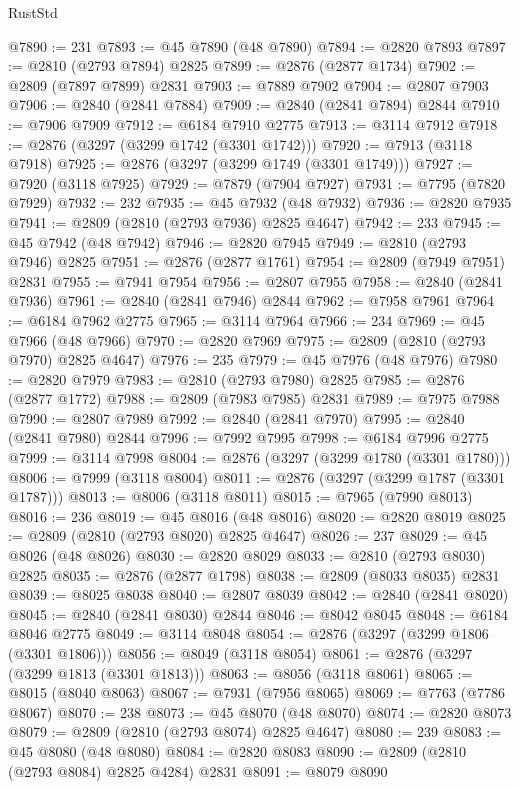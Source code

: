 \begin{lexlean}{RustStd}
\begin{coremodule}
@7890 := 231
@7893 := @45 @7890 (@48 @7890)
@7894 := @2820 @7893
@7897 := @2810 (@2793 @7894) @2825
@7899 := @2876 (@2877 @1734)
@7902 := @2809 (@7897 @7899) @2831
@7903 := @7889 @7902
@7904 := @2807 @7903
@7906 := @2840 (@2841 @7884)
@7909 := @2840 (@2841 @7894) @2844
@7910 := @7906 @7909
@7912 := @6184 @7910 @2775
@7913 := @3114 @7912
@7918 := @2876 (@3297 (@3299 @1742 (@3301 @1742)))
@7920 := @7913 (@3118 @7918)
@7925 := @2876 (@3297 (@3299 @1749 (@3301 @1749)))
@7927 := @7920 (@3118 @7925)
@7929 := @7879 (@7904 @7927)
@7931 := @7795 (@7820 @7929)
@7932 := 232
@7935 := @45 @7932 (@48 @7932)
@7936 := @2820 @7935
@7941 := @2809 (@2810 (@2793 @7936) @2825 @4647)
@7942 := 233
@7945 := @45 @7942 (@48 @7942)
@7946 := @2820 @7945
@7949 := @2810 (@2793 @7946) @2825
@7951 := @2876 (@2877 @1761)
@7954 := @2809 (@7949 @7951) @2831
@7955 := @7941 @7954
@7956 := @2807 @7955
@7958 := @2840 (@2841 @7936)
@7961 := @2840 (@2841 @7946) @2844
@7962 := @7958 @7961
@7964 := @6184 @7962 @2775
@7965 := @3114 @7964
@7966 := 234
@7969 := @45 @7966 (@48 @7966)
@7970 := @2820 @7969
@7975 := @2809 (@2810 (@2793 @7970) @2825 @4647)
@7976 := 235
@7979 := @45 @7976 (@48 @7976)
@7980 := @2820 @7979
@7983 := @2810 (@2793 @7980) @2825
@7985 := @2876 (@2877 @1772)
@7988 := @2809 (@7983 @7985) @2831
@7989 := @7975 @7988
@7990 := @2807 @7989
@7992 := @2840 (@2841 @7970)
@7995 := @2840 (@2841 @7980) @2844
@7996 := @7992 @7995
@7998 := @6184 @7996 @2775
@7999 := @3114 @7998
@8004 := @2876 (@3297 (@3299 @1780 (@3301 @1780)))
@8006 := @7999 (@3118 @8004)
@8011 := @2876 (@3297 (@3299 @1787 (@3301 @1787)))
@8013 := @8006 (@3118 @8011)
@8015 := @7965 (@7990 @8013)
@8016 := 236
@8019 := @45 @8016 (@48 @8016)
@8020 := @2820 @8019
@8025 := @2809 (@2810 (@2793 @8020) @2825 @4647)
@8026 := 237
@8029 := @45 @8026 (@48 @8026)
@8030 := @2820 @8029
@8033 := @2810 (@2793 @8030) @2825
@8035 := @2876 (@2877 @1798)
@8038 := @2809 (@8033 @8035) @2831
@8039 := @8025 @8038
@8040 := @2807 @8039
@8042 := @2840 (@2841 @8020)
@8045 := @2840 (@2841 @8030) @2844
@8046 := @8042 @8045
@8048 := @6184 @8046 @2775
@8049 := @3114 @8048
@8054 := @2876 (@3297 (@3299 @1806 (@3301 @1806)))
@8056 := @8049 (@3118 @8054)
@8061 := @2876 (@3297 (@3299 @1813 (@3301 @1813)))
@8063 := @8056 (@3118 @8061)
@8065 := @8015 (@8040 @8063)
@8067 := @7931 (@7956 @8065)
@8069 := @7763 (@7786 @8067)
@8070 := 238
@8073 := @45 @8070 (@48 @8070)
@8074 := @2820 @8073
@8079 := @2809 (@2810 (@2793 @8074) @2825 @4647)
@8080 := 239
@8083 := @45 @8080 (@48 @8080)
@8084 := @2820 @8083
@8090 := @2809 (@2810 (@2793 @8084) @2825 @4284) @2831
@8091 := @8079 @8090

\end{coremodule}
\end{lexlean}
